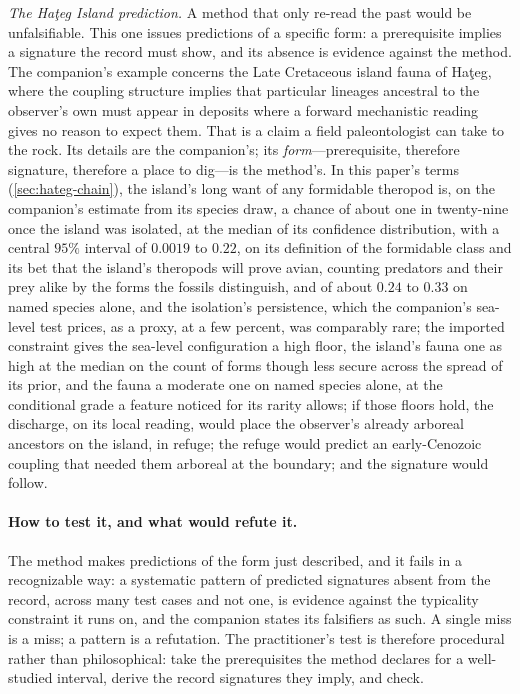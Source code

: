 \documentclass[11pt]{article}
\theoremstyle{definition}
\begin{document}
\emph{The Ha\c{t}eg Island prediction.} A method that only re-read the past would be unfalsifiable. This one issues predictions of a specific form: a prerequisite implies a signature the record must show, and its absence is evidence against the method. The companion's example concerns the Late Cretaceous island fauna of Ha\c{t}eg, where the coupling structure implies that particular lineages ancestral to the observer's own must appear in deposits where a forward mechanistic reading gives no reason to expect them. That is a claim a field paleontologist can take to the rock. Its details are the companion's; its \emph{form}---prerequisite, therefore signature, therefore a place to dig---is the method's. In this paper's terms (\autoref{sec:hateg-chain}), the island's long want of any formidable theropod is, on the companion's estimate from its species draw, a chance of about one in twenty-nine once the island was isolated, at the median of its confidence distribution, with a central $95\%$ interval of $0.0019$ to $0.22$, on its definition of the formidable class and its bet that the island's theropods will prove avian, counting predators and their prey alike by the forms the fossils distinguish, and of about $0.24$ to $0.33$ on named species alone, and the isolation's persistence, which the companion's sea-level test prices, as a proxy, at a few percent, was comparably rare; the imported constraint gives the sea-level configuration a high floor, the island's fauna one as high at the median on the count of forms though less secure across the spread of its prior, and the fauna a moderate one on named species alone, at the conditional grade a feature noticed for its rarity allows; if those floors hold, the discharge, on its local reading, would place the observer's already arboreal ancestors on the island, in refuge; the refuge would predict an early-Cenozoic coupling that needed them arboreal at the boundary; and the signature would follow.

\paragraph{How to test it, and what would refute it.} The method makes predictions of the form just described, and it fails in a recognizable way: a systematic pattern of predicted signatures absent from the record, across many test cases and not one, is evidence against the typicality constraint it runs on, and the companion states its falsifiers as such. A single miss is a miss; a pattern is a refutation. The practitioner's test is therefore procedural rather than philosophical: take the prerequisites the method declares for a well-studied interval, derive the record signatures they imply, and check.
\end{document}
